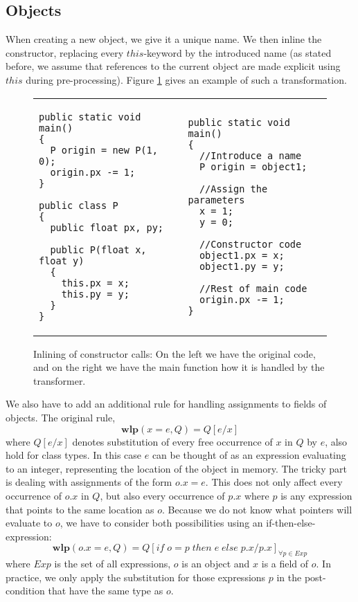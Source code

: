 \documentclass[a4paper, fleqn]{article}
\newcommand{\wlp}{\textbf{wlp}\xspace}
\begin{document}
\subsection{Objects}
When creating a new object, we give it a unique name. We then inline the constructor, replacing every $this$-keyword by the introduced name (as stated before, we assume that references to the current object are made explicit using $this$ during pre-processing). Figure \ref{constructor calls} gives an example of such a transformation.

\begin{center}
\begin{figure}
\begin{tabular}{ p{6cm} | p{8cm}}
\begin{lstlisting}
public static void main() 
{
  P origin = new P(1, 0);
  origin.px -= 1;
}

public class P
{
  public float px, py;

  public P(float x, float y)
  {
    this.px = x;
    this.py = y;
  }
}
\end{lstlisting}
&
\begin{lstlisting}
public static void main() 
{
  //Introduce a name
  P origin = object1;

  //Assign the parameters
  x = 1;
  y = 0;

  //Constructor code
  object1.px = x;
  object1.py = y;

  //Rest of main code
  origin.px -= 1;
}
\end{lstlisting}
\end{tabular}
\caption{Inlining of constructor calls: On the left we have the original code, and on the right we have the main function how it is handled by the transformer.}
\label{constructor calls}
\end{figure}
\end{center}

We also have to add an additional rule for handling assignments to fields of objects. The original rule, \[\wlp(x = e, Q) = Q[e/x]\] where $Q[e/x]$ denotes substitution of every free occurrence of $x$ in $Q$ by $e$, also hold for class types. In this case $e$ can be thought of as an expression evaluating to an integer, representing the location of the object in memory. The tricky part is dealing with assignments of the form $o.x = e$. This does not only affect every occurrence of $o.x$ in $Q$, but also every occurrence of $p.x$ where $p$ is any expression that points to the same location as $o$. Because we do not know what pointers will evaluate to $o$, we have to consider both possibilities using an if-then-else-expression: \[\wlp(o.x = e, Q) = Q[if \; o = p \; then \; e  \; else \; p.x/p.x]_{\forall p \in Exp}\] where $Exp$ is the set of all expressions, $o$ is an object and $x$ is a field of $o$. In practice, we only apply the substitution for those expressions $p$ in the post-condition that have the same type as $o$.
\end{document}
